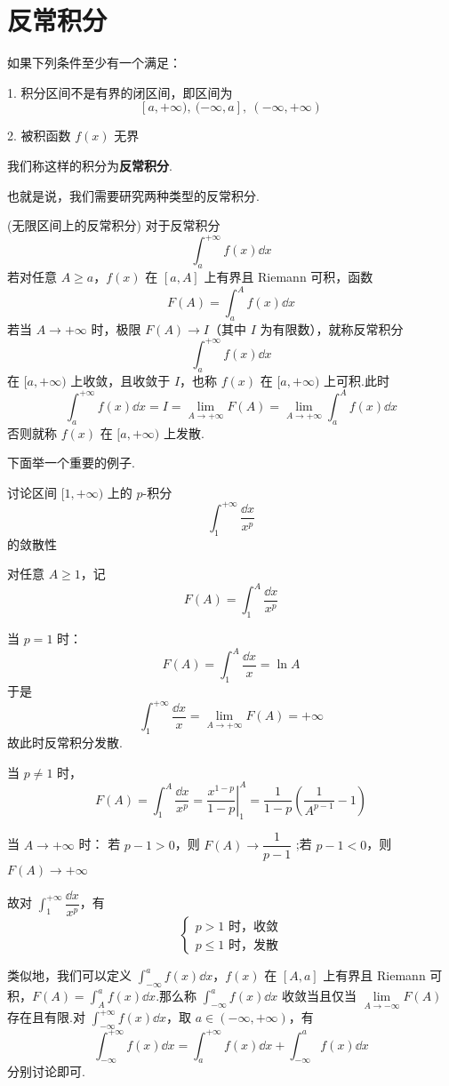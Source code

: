 \section{反常积分}
如果下列条件至少有一个满足：

1. 积分区间不是有界的闭区间，即区间为
\[
[a, +\infty),\ (-\infty, a],\ (-\infty, +\infty)
\]

2. 被积函数 \( f(x) \) 无界

我们称这样的积分为\textbf{反常积分}.

也就是说，我们需要研究两种类型的反常积分.

\begin{definition}(无限区间上的反常积分)\label{无限区间上的反常积分}
	对于反常积分
	\[
	\int_a^{+\infty} f(x)\dd x
	\]
	若对任意 \(A \ge a\)，\(f(x)\) 在 \([a,A]\) 上有界且 Riemann 可积，函数
	\[
	F(A) = \int_a^A f(x)\dd x
	\]
	若当 \(A \to +\infty\) 时，极限 \(F(A) \to I\)（其中 \(I\) 为有限数），就称反常积分
	\[
	\int_a^{+\infty} f(x)\dd x
	\]
	在 \([a,+\infty)\) 上收敛，且收敛于 \(I\)，也称 \(f(x)\) 在 \([a,+\infty)\) 上可积.此时
	\[
	\int_a^{+\infty} f(x)\dd x = I = \lim_{A \to +\infty} F(A) = \lim_{A \to +\infty} \int_a^A f(x)\dd x
	\]
	否则就称 \(f(x)\) 在 \([a,+\infty)\) 上发散.
\end{definition}
下面举一个重要的例子.

\begin{example}
	讨论区间 $[1,+\infty)$ 上的 $p$-积分
	\[
	\int_1^{+\infty} \frac{\dd x}{x^p}
	\] 的敛散性
\end{example}
\begin{solution}
	对任意 $A\geqslant1$，记
	\[
	F(A) = \int_1^A \frac{\dd x}{x^p}
	\]
	
	当 $p=1$ 时：
	\[
	F(A) = \int_1^A \frac{\dd x}{x} = \ln A
	\]
	于是
	\[
	\int_1^{+\infty} \frac{\dd x}{x} = \lim_{A \to +\infty} F(A) = +\infty
	\]
	故此时反常积分发散.
	
	当 $p \neq 1$ 时，
	\[
	F(A) = \int_1^A \frac{\dd x}{x^p} = \left. \dfrac{x^{1-p}}{1-p} \right|_1^A = \dfrac{1}{1-p} \left( \frac{1}{A^{p-1}} - 1 \right)
	\]
	
	当 $A \to +\infty$ 时：
	若 $p-1 > 0$，则 $F(A) \to \dfrac{1}{p-1}$
	;若 $p-1 < 0$，则 $F(A) \to +\infty$
	
	故对 $\displaystyle\int_1^{+\infty} \dfrac{\dd x}{x^p}$，有
	\[
	\begin{cases}
		p>1 \text{ 时，收敛} \\
		p \leq 1 \text{ 时，发散}
	\end{cases}
	\]
\end{solution}
类似地，我们可以定义 $\displaystyle\int_{-\infty}^a f(x)\dd x$，$f(x)$ 在 $[A,a]$ 上有界且 Riemann 可积，$F(A)=\displaystyle\int_A^a f(x)\dd x$.那么称 $\displaystyle\int_{-\infty}^a f(x)\dd x$ 收敛当且仅当 $\lim\limits_{A\to -\infty} F(A)$ 存在且有限.对 $\displaystyle\int_{-\infty}^{+\infty} f(x)\dd x$，取 $a\in(-\infty,+\infty)$，有
\[
\int_{-\infty}^{+\infty} f(x)\dd x = \int_a^{+\infty} f(x)\dd x + \int_{-\infty}^a f(x)\dd x
\]
分别讨论即可.

